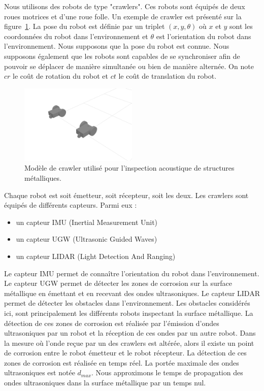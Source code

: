 \documentclass[francais,RandD]{rapportPFE}
\begin{document}
			Nous utilisons des robots de type "crawlers". Ces robots sont équipés de deux roues motrices et d'une roue folle.
			Un exemple de crawler est présenté sur la figure~\ref{fig:crawler}.
			La pose du robot est définie par un triplet $(x, y, \theta)$ où $x$ et $y$ sont les coordonnées du robot dans l'environnement et $\theta$ est l'orientation du robot dans l'environnement.
			Nous supposons que la pose du robot est connue.
			Nous supposons également que les robots sont capables de se synchroniser afin de pouvoir se déplacer de manière simultanée ou bien de manière alternée.
			On note $cr$ le coût de rotation du robot et $ct$ le coût de translation du robot.

			\begin{figure}[h!]
				\centering
				\includegraphics[width=0.5\textwidth]{graphics/crawlers.png}
				\caption{Modèle de crawler utilisé pour l'inspection acoustique de structures métalliques.}
				\label{fig:crawler}
			\end{figure}

			Chaque robot est soit émetteur, soit récepteur, soit les deux.
			Les crawlers sont équipés de différents capteurs.
			Parmi eux :
			\begin{itemize}
				\item un capteur IMU (Inertial Measurement Unit)
				\item un capteur UGW (Ultrasonic Guided Waves)
				\item un capteur LIDAR (Light Detection And Ranging)
			\end{itemize}
			Le capteur IMU permet de connaître l'orientation du robot dans l'environnement.
			Le capteur UGW permet de détecter les zones de corrosion sur la surface métallique en émettant et en recevant des ondes ultrasoniques.
			Le capteur LIDAR permet de détecter les obstacles dans l'environnement.
			Les obstacles considérés ici, sont principalement les différents robots inspectant la surface métallique.
			La détection de ces zones de corrosion est réalisée par l'émission d'ondes ultrasoniques par un robot et la réception de ces ondes par un autre robot.
			Dans la mesure où l'onde reçue par un des crawlers est altérée, alors il existe un point de corrosion entre le robot émetteur et le robot récepteur.
			La détection de ces zones de corrosion est réalisée en temps réel.
			La portée maximale des ondes ultrasoniques est notée $d_{max}$.
			Nous approximons le temps de propagation des ondes ultrasoniques dans la surface métallique par un temps nul.
\end{document}
